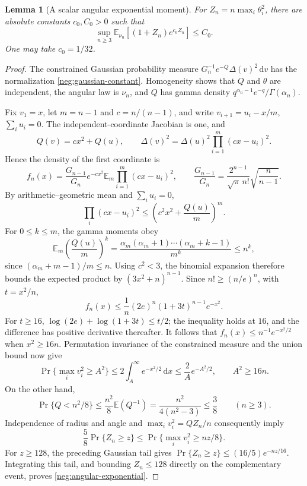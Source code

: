 \documentclass[11pt]{article}
\numberwithin{equation}{section}
\newtheorem{lemma}[theorem]{Lemma}
\theoremstyle{definition}
\newcommand{\dd}{\,\mathrm d}
\begin{document}
\begin{lemma}[A scalar angular exponential moment]
\label{neg:angular-moment}
For \(Z_n=n\max_i\theta_i^2\), there are absolute constants
\(c_0,C_0>0\) such that
\begin{equation}
 \sup_{n\ge3}\mathbb E_{\nu_n}[(1+Z_n)e^{c_0Z_n}]\le C_0.
 \label{neg:angular-exponential}
\end{equation}
One may take \(c_0=1/32\).
\end{lemma}
\begin{proof}
The constrained Gaussian probability measure
\(G_n^{-1}e^{-Q}\Delta(v)^2\dd v\) has the normalization
\eqref{neg:gaussian-constant}.  Homogeneity shows that \(Q\) and
\(\theta\) are independent, the angular law is \(\nu_n\), and
\(Q\) has gamma density \(q^{\alpha_n-1}e^{-q}/\Gamma(\alpha_n)\).

Fix \(v_1=x\), let \(m=n-1\) and \(c=n/(n-1)\), and write
\(v_{i+1}=u_i-x/m\), \(\sum_i u_i=0\).  The independent-coordinate
Jacobian is one, and
\[
 Q(v)=cx^2+Q(u),\qquad
 \Delta(v)^2=\Delta(u)^2\prod_{i=1}^m(cx-u_i)^2.
\]
Hence the density of the first coordinate is
\[
 f_n(x)=\frac{G_{n-1}}{G_n}e^{-cx^2}
       \mathbb E_m\prod_{i=1}^m(cx-u_i)^2,
 \qquad
 \frac{G_{n-1}}{G_n}=
 \frac{2^{n-1}}{\sqrt\pi\,n!}\sqrt{\frac n{n-1}}.
\]
By arithmetic--geometric mean and \(\sum_i u_i=0\),
\[
 \prod_i(cx-u_i)^2\le\left(c^2x^2+\frac{Q(u)}m\right)^m.
\]
For \(0\le k\le m\), the gamma moments obey
\[
 \mathbb E_m\left(\frac{Q(u)}m\right)^k
 =\frac{\alpha_m(\alpha_m+1)\cdots(\alpha_m+k-1)}{m^k}
 \le n^k,
\]
since \((\alpha_m+m-1)/m\le n\).  Using \(c^2<3\), the
binomial expansion therefore bounds the expected product by
\((3x^2+n)^{n-1}\).  Since \(n!\ge(n/e)^n\), with \(t=x^2/n\),
\[
 f_n(x)\le\frac1n(2e)^n(1+3t)^{n-1}e^{-x^2}.
\]
For \(t\ge16\),
\(\log(2e)+\log(1+3t)\le t/2\); the inequality holds at
\(16\), and the difference has positive derivative thereafter.
It follows that
\(f_n(x)\le n^{-1}e^{-x^2/2}\) when \(x^2\ge16n\).
Permutation invariance of the constrained measure and the union
bound now give
\[
 \Pr\{\max_i v_i^2\ge A^2\}
 \le2\int_A^\infty e^{-x^2/2}\dd x
 \le\frac2A e^{-A^2/2},\qquad A^2\ge16n.
\]
On the other hand,
\[
 \Pr\{Q<n^2/8\}
 \le\frac{n^2}{8}\mathbb E(Q^{-1})
 =\frac{n^2}{4(n^2-3)}\le\frac38\qquad(n\ge3).
\]
Independence of radius and angle and
\(\max_i v_i^2=QZ_n/n\) consequently imply
\[
 \frac58\Pr\{Z_n\ge z\}\le
       \Pr\{\max_i v_i^2\ge nz/8\}.
\]
For \(z\ge128\), the preceding Gaussian tail gives
\(\Pr\{Z_n\ge z\}\le(16/5)e^{-nz/16}\).
Integrating this tail, and bounding \(Z_n\le128\) directly on
the complementary event, proves \eqref{neg:angular-exponential}.
\end{proof}
\end{document}
